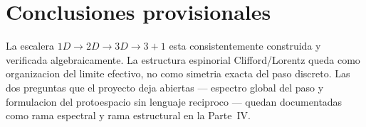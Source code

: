 \chapter*{Conclusiones provisionales}

La escalera $1D \to 2D \to 3D \to 3+1$ esta consistentemente construida y
verificada algebraicamente. La estructura espinorial Clifford/Lorentz queda
como organizacion del limite efectivo, no como simetria exacta del paso
discreto. Las dos preguntas que el proyecto deja abiertas --- espectro
global del paso y formulacion del protoespacio sin lenguaje reciproco ---
quedan documentadas como rama espectral y rama estructural en la Parte~IV.
